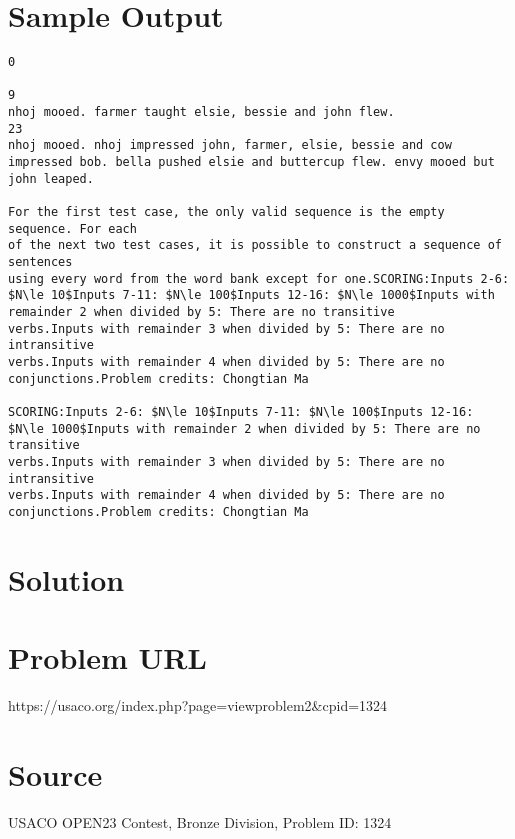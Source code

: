 \documentclass[12pt]{article}
\begin{document}
\section*{Sample Output}
\begin{verbatim}
0

9
nhoj mooed. farmer taught elsie, bessie and john flew.
23
nhoj mooed. nhoj impressed john, farmer, elsie, bessie and cow impressed bob. bella pushed elsie and buttercup flew. envy mooed but john leaped.

For the first test case, the only valid sequence is the empty sequence. For each
of the next two test cases, it is possible to construct a sequence of sentences
using every word from the word bank except for one.SCORING:Inputs 2-6: $N\le 10$Inputs 7-11: $N\le 100$Inputs 12-16: $N\le 1000$Inputs with remainder 2 when divided by 5: There are no transitive
verbs.Inputs with remainder 3 when divided by 5: There are no intransitive
verbs.Inputs with remainder 4 when divided by 5: There are no conjunctions.Problem credits: Chongtian Ma

SCORING:Inputs 2-6: $N\le 10$Inputs 7-11: $N\le 100$Inputs 12-16: $N\le 1000$Inputs with remainder 2 when divided by 5: There are no transitive
verbs.Inputs with remainder 3 when divided by 5: There are no intransitive
verbs.Inputs with remainder 4 when divided by 5: There are no conjunctions.Problem credits: Chongtian Ma
\end{verbatim}

\section*{Solution}


\section*{Problem URL}
https://usaco.org/index.php?page=viewproblem2&cpid=1324

\section*{Source}
USACO OPEN23 Contest, Bronze Division, Problem ID: 1324
\end{document}
